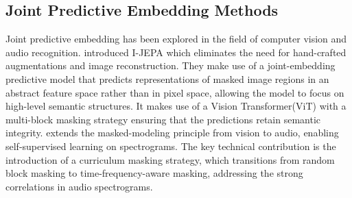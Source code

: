 \subsection{Joint Predictive Embedding Methods}
Joint predictive embedding has been explored in the field of computer vision and audio recognition. \citep{assran2023self} introduced I-JEPA which eliminates the need for hand-crafted augmentations and image reconstruction. They make use of a joint-embedding predictive model that predicts representations of masked image regions in an abstract feature space rather than in pixel space, allowing the model to focus on high-level semantic structures. It makes use of a Vision Transformer(ViT) with a multi-block masking strategy ensuring that the predictions retain semantic integrity. \citep{fei2023jepa}  extends the masked-modeling principle from vision to audio, enabling self-supervised learning on spectrograms. The key technical contribution is the introduction of a curriculum masking strategy, which transitions from random block masking to time-frequency-aware masking, addressing the strong correlations in audio spectrograms.